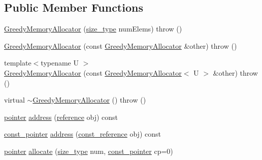 \subsection*{Public Member Functions}
\begin{DoxyCompactItemize}
\item 
\hyperlink{classuva_1_1utils_1_1containers_1_1alloc_1_1_greedy_memory_allocator_ad094b548cabac6751c63cef8e0c8f65b}{Greedy\+Memory\+Allocator} (\hyperlink{classuva_1_1utils_1_1containers_1_1alloc_1_1_greedy_memory_allocator_a645a2906fb2579230ee5f98e98161c11}{size\+\_\+type} num\+Elems)  throw ()
\item 
\hyperlink{classuva_1_1utils_1_1containers_1_1alloc_1_1_greedy_memory_allocator_ac58acaa1c86e62992d2e2025d54e496b}{Greedy\+Memory\+Allocator} (const \hyperlink{classuva_1_1utils_1_1containers_1_1alloc_1_1_greedy_memory_allocator}{Greedy\+Memory\+Allocator} \&other)  throw ()
\item 
{\footnotesize template$<$typename U $>$ }\\\hyperlink{classuva_1_1utils_1_1containers_1_1alloc_1_1_greedy_memory_allocator_a38f0a71883a432fbc03ecad16dfcbc9f}{Greedy\+Memory\+Allocator} (const \hyperlink{classuva_1_1utils_1_1containers_1_1alloc_1_1_greedy_memory_allocator}{Greedy\+Memory\+Allocator}$<$ U $>$ \&other)  throw ()
\item 
virtual \hyperlink{classuva_1_1utils_1_1containers_1_1alloc_1_1_greedy_memory_allocator_a7f111264b144a1685ac693e7deb34845}{$\sim$\+Greedy\+Memory\+Allocator} ()  throw ()
\item 
\hyperlink{classuva_1_1utils_1_1containers_1_1alloc_1_1_greedy_memory_allocator_a91591d8ee983d330817127d4acaeea27}{pointer} \hyperlink{classuva_1_1utils_1_1containers_1_1alloc_1_1_greedy_memory_allocator_a2f43e63d33167b3ed546365336f5e9b2}{address} (\hyperlink{classuva_1_1utils_1_1containers_1_1alloc_1_1_greedy_memory_allocator_ac2a2c7238fc7d9727230c23bd3cc8743}{reference} obj) const 
\item 
\hyperlink{classuva_1_1utils_1_1containers_1_1alloc_1_1_greedy_memory_allocator_a206c9d79b70e9935b7de841ceb45ab7f}{const\+\_\+pointer} \hyperlink{classuva_1_1utils_1_1containers_1_1alloc_1_1_greedy_memory_allocator_a659b7b193b340ba0d4efe5d3b167f89f}{address} (\hyperlink{classuva_1_1utils_1_1containers_1_1alloc_1_1_greedy_memory_allocator_a7911b8e1f044aab418c3b46d6df2f92a}{const\+\_\+reference} obj) const 
\item 
\hyperlink{classuva_1_1utils_1_1containers_1_1alloc_1_1_greedy_memory_allocator_a91591d8ee983d330817127d4acaeea27}{pointer} \hyperlink{classuva_1_1utils_1_1containers_1_1alloc_1_1_greedy_memory_allocator_ab73b9ce4c6e83972804a277cef2b8103}{allocate} (\hyperlink{classuva_1_1utils_1_1containers_1_1alloc_1_1_greedy_memory_allocator_a645a2906fb2579230ee5f98e98161c11}{size\+\_\+type} num, \hyperlink{classuva_1_1utils_1_1containers_1_1alloc_1_1_greedy_memory_allocator_a206c9d79b70e9935b7de841ceb45ab7f}{const\+\_\+pointer} cp=0)

\end{DoxyCompactItemize}
